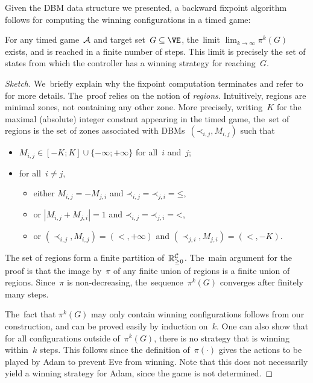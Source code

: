 Given the DBM data structure we presented,
a backward fixpoint algorithm follows for computing the winning configurations in a timed game:

\begin{theorem}
   \label{9-thm:timed-control}
   For any timed game~$\mathcal{A}$ and target set~$G \subseteq \VE$, 
   the~limit $\lim_{k \rightarrow \infty} \pi^k(G)$ exists, and is reached 
   in a finite number of steps. This limit is precisely the set of states from
   which the controller has a winning strategy for reaching~$G$.
\end{theorem}

\begin{proof}[Sketch]
  We~briefly explain why the fixpoint computation terminates and refer
  to~\cite{AMPS98,CDFLL05} for more details.  The~proof relies on the notion of
  \emph{regions}. Intuitively, regions are minimal zones, not
  containing any other zone. More precisely, writing~$K$ for the maximal
  (absolute) integer constant appearing in the timed game, the~set of regions is
  the set of zones associated with
  DBMs~$(\mathord\prec_{i,j},M_{i,j})$ such that
  \begin{itemize}
  \item $M_{i,j}\in [-K; K]\cup\{-\infty;+\infty\}$ for all~$i$ and~$j$;
  \item for all~$i\not=j$,
     \begin{itemize}
    \item either $M_{i,j}=-M_{j,i}$ and
      $\mathord\prec_{i,j}=\mathord\prec_{j,i}=\mathord\leq$,
     \item or $|M_{i,j}+M_{j,i}|=1$ and 
      $\mathord\prec_{i,j}=\mathord\prec_{j,i}=\mathord<$,
    \item or $(\prec_{i,j},M_{i,j})=(<,+\infty)$ and $(\prec_{j,i},M_{j,i})=(<,-K)$.
     \end{itemize}
  \end{itemize}
  The set of regions form a finite partition of~$\mathbb{R}_{\geq 0}^{\mathcal{C}}$.
  The~main argument for the proof is that the
  image by~$\pi$ of any finite union of regions is a finite union of
  regions. Since~$\pi$ is non-decreasing, the~sequence~$\pi^k(G)$
  converges after finitely many steps.

  The~fact that $\pi^k(G)$ may
  only contain winning configurations follows from our construction,
  and can be proved easily by induction on~$k$.
  One can also show that for all configurations outside of~$\pi^k(G)$,
  there is no strategy that is winning within~$k$ steps. This follows since
  the definition of~$\pi(\cdot)$ gives the actions to be played by Adam to
  prevent Eve from winning.
  Note that this does not necessarily yield a winning strategy for Adam,
  since the game is not determined.
\end{proof}

